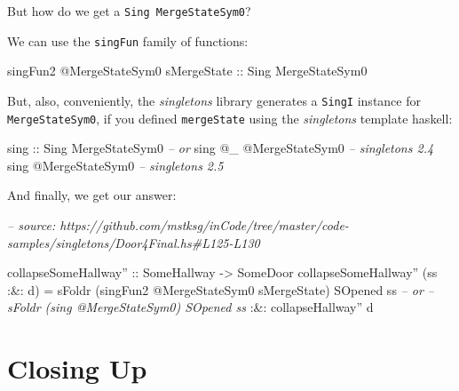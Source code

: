 \documentclass[]{article}
\newenvironment{Shaded}{}{}
\newcommand{\CommentTok}[1]{\textcolor[rgb]{0.38,0.63,0.69}{\textit{#1}}}
\newcommand{\DataTypeTok}[1]{\textcolor[rgb]{0.56,0.13,0.00}{#1}}
\newcommand{\FunctionTok}[1]{\textcolor[rgb]{0.02,0.16,0.49}{#1}}
\newcommand{\NormalTok}[1]{#1}
\newcommand{\OtherTok}[1]{\textcolor[rgb]{0.00,0.44,0.13}{#1}}
\begin{document}
But how do we get a \texttt{Sing\ MergeStateSym0}?

We can use the \texttt{singFun} family of functions:

\begin{Shaded}
\begin{Highlighting}[]
\NormalTok{singFun2 }\FunctionTok{@}\DataTypeTok{MergeStateSym0}\NormalTok{ sMergeState}
\OtherTok{    ::} \DataTypeTok{Sing} \DataTypeTok{MergeStateSym0}
\end{Highlighting}
\end{Shaded}

But, also, conveniently, the \emph{singletons} library generates a
\texttt{SingI} instance for \texttt{MergeStateSym0}, if you defined
\texttt{mergeState} using the \emph{singletons} template haskell:

\begin{Shaded}
\begin{Highlighting}[]
\OtherTok{sing ::} \DataTypeTok{Sing} \DataTypeTok{MergeStateSym0}
\CommentTok{-- or}
\NormalTok{sing }\FunctionTok{@}\NormalTok{_ }\FunctionTok{@}\DataTypeTok{MergeStateSym0}         \CommentTok{-- singletons 2.4}
\NormalTok{sing }\FunctionTok{@}\DataTypeTok{MergeStateSym0}            \CommentTok{-- singletons 2.5}
\end{Highlighting}
\end{Shaded}

And finally, we get our answer:

\begin{Shaded}
\begin{Highlighting}[]
\CommentTok{-- source: https://github.com/mstksg/inCode/tree/master/code-samples/singletons/Door4Final.hs#L125-L130}

\OtherTok{collapseSomeHallway'' ::} \DataTypeTok{SomeHallway} \OtherTok{->} \DataTypeTok{SomeDoor}
\NormalTok{collapseSomeHallway'' (ss }\FunctionTok{:&:}\NormalTok{ d) }\FunctionTok{=}
\NormalTok{        sFoldr (singFun2 }\FunctionTok{@}\DataTypeTok{MergeStateSym0}\NormalTok{ sMergeState) }\DataTypeTok{SOpened}\NormalTok{ ss}
     \CommentTok{-- or}
     \CommentTok{-- sFoldr (sing @MergeStateSym0) SOpened ss}
    \FunctionTok{:&:}\NormalTok{ collapseHallway'' d}
\end{Highlighting}
\end{Shaded}

\hypertarget{closing-up}{%
\section{Closing Up}\label{closing-up}}
\end{document}
